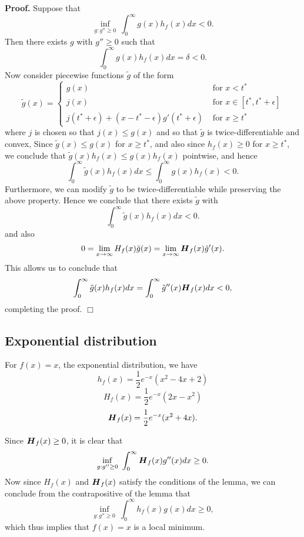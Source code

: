 \documentclass[11pt]{article}
\begin{document}
\noindent \textbf{Proof.}  
Suppose that
\[
\inf_{g: g'' \geq 0}\ \int_0^\infty g(x) h_f(x) dx < 0.
\]
Then there exists $g$ with $g'' \geq 0$ such that
\[
\int_0^\infty g(x) h_f(x) dx  = \delta < 0.
\]
Now consider piecewise functions $\tilde{g}$ of the form
\[
\tilde{g}(x) = \begin{cases}
g(x) &\text{ for } x < t^*\\
j(x) &\text{ for } x \in [t^*, t^* + \epsilon]\\
j(t^* + \epsilon) + (x-t^*-\epsilon)g'(t^* + \epsilon) &\text{ for }x \geq t^*
\end{cases}
\]
where $j$ is chosen so that $j(x) \leq g(x)$ and so that $\tilde{g}$ is twice-differentiable and convex,
Since $\tilde{g}(x) \leq g(x)$ for $x \geq t^*$,
and also since $h_f(x) \geq 0$ for $x \geq t^*$,
we conclude that $\tilde{g}(x) h_f(x) \leq g(x) h_f(x)$ pointwise,
and hence
\[
\int_0^\infty \tilde{g}(x) h_f(x) dx \leq \int_0^\infty g(x) h_f(x) < 0.
\]
Furthermore, we can modify $\tilde{g}$ to be twice-differentiable while preserving the above property.
Hence we conclude that there exists
$\tilde{g}$ with
\[
\int_0^\infty \tilde{g}(x) h_f(x) dx  < 0.
\]
and also
\[
0 = \lim_{x \to \infty} H_f(x) \tilde{g}(x) = \lim_{x \to \infty} \boldsymbol{H}_f(x) \tilde{g}'(x).
\]
This allows us to conclude that
\[
\int_0^\infty \tilde{g}(x) h_f(x) dx = \int_0^\infty \tilde{g}''(x) \boldsymbol{H}_f(x) dx < 0,
\]
completing the proof. $\Box$

\subsection{Exponential distribution}

For $f(x) = x$, the exponential distribution, we have
\[
h_f(x) = \frac{1}{2}e^{-x}(x^2 - 4x + 2)
\]
\[
H_f(x) = \frac{1}{2}e^{-x}(2x-x^2)
\]
\[
\boldsymbol{H}_f(x) = \frac{1}{2}e^{-x}(x^2 + 4x).
\]

Since $\boldsymbol{H}_f(x) \geq 0$, it is clear that
\[
\inf_{g: g'' \geq 0}\ \int_0^\infty \boldsymbol{H}_f(x) g''(x) dx \geq 0.
\]
Now since $H_f(x)$ and $\boldsymbol{H}_f(x)$ satisfy the conditions of the lemma, we can conclude from the contrapositive of the lemma that
\[
\inf_{g: g'' \geq 0}\ \int_0^\infty h_f(x) g(x) dx \geq 0,
\]
which thus implies that $f(x) = x$ is a local minimum.
\end{document}
